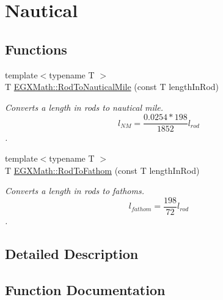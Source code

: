 \hypertarget{group___e_g_x_math-_conversions-_length_conversions-_surveyors-_rod-_nautical}{}\section{Nautical}
\label{group___e_g_x_math-_conversions-_length_conversions-_surveyors-_rod-_nautical}
\subsection*{Functions}
\begin{DoxyCompactItemize}
\item 
{\footnotesize template$<$typename T $>$ }\\T \mbox{\hyperlink{group___e_g_x_math-_conversions-_length_conversions-_surveyors-_rod-_nautical_ga68825640131c61e55490acfcb616aa78}{E\+G\+X\+Math\+::\+Rod\+To\+Nautical\+Mile}} (const T length\+In\+Rod)
\begin{DoxyCompactList}\small\item\em Converts a length in rods to nautical mile. \[ l_{NM}= \frac{0.0254 * 198}{1852} l_{rod} \]. \end{DoxyCompactList}\item 
{\footnotesize template$<$typename T $>$ }\\T \mbox{\hyperlink{group___e_g_x_math-_conversions-_length_conversions-_surveyors-_rod-_nautical_gaf0e4a1c1d7f8d23f57c1c2df8a617c7c}{E\+G\+X\+Math\+::\+Rod\+To\+Fathom}} (const T length\+In\+Rod)
\begin{DoxyCompactList}\small\item\em Converts a length in rods to fathoms. \[ l_{fathom}= \frac{198}{72} l_{rod} \]. \end{DoxyCompactList}\end{DoxyCompactItemize}


\subsection{Detailed Description}


\subsection{Function Documentation}
\mbox{\label{group___e_g_x_math-_conversions-_length_conversions-_surveyors-_rod-_nautical_gaf0e4a1c1d7f8d23f57c1c2df8a617c7c}} 
